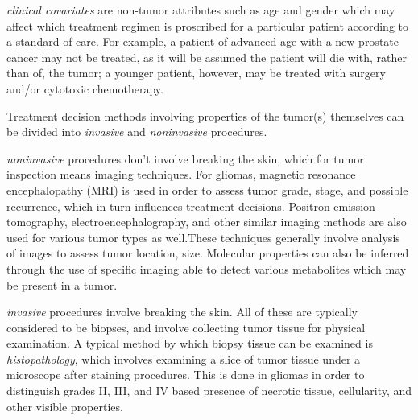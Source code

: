       \textit{clinical covariates} are non-tumor attributes such as age and gender
      which may affect which treatment regimen is proscribed for a
      particular patient according to a standard of care. For example,
      a patient of advanced age with a new prostate cancer may not be
      treated, as it will be assumed the patient will die with, rather
      than of, the tumor; a younger patient, however, may be treated
      with surgery and/or cytotoxic chemotherapy.

      Treatment decision methods involving properties of the tumor(s)
      themselves can be divided into \textit{invasive} and
      \textit{noninvasive} procedures.

      \textit{noninvasive} procedures don't involve breaking the skin,
      which for tumor inspection means imaging techniques. For
      gliomas, magnetic resonance encephalopathy (MRI) is used in
      order to assess tumor grade, stage, and possible recurrence, which in turn influences
      treatment decisions. Positron emission tomography,
      electroencephalography, and other similar imaging methods are
      also used for various tumor types as well.These techniques
      generally involve analysis of images to assess tumor location,
      size. Molecular properties can also be inferred through the use
      of specific imaging able to detect various metabolites which may
      be present in a tumor. 

      \textit{invasive} procedures involve breaking the skin. All of
      these are typically considered to be biopses, and involve
      collecting tumor tissue for physical examination. A typical
      method by which biopsy tissue can be examined is
      \textit{histopathology}, which
      involves examining a slice of tumor tissue under a microscope
      after staining procedures. This is done in gliomas in order to
      distinguish grades II, III, and IV based presence of necrotic
      tissue, cellularity, and other visible properties. 





       
       


        

        
        

        


        